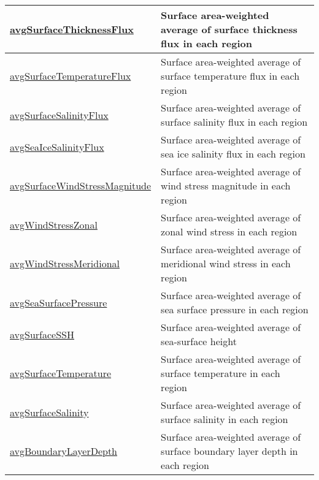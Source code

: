 {\begin{center}
\begin{longtable}{| p{2.0in} | p{4.0in} |}
    \hline
    \hyperref[subsec:var_sec_surfaceAreaWeightedAveragesAM_avgSurfaceThicknessFlux]{avgSurfaceThicknessFlux} & Surface area-weighted average of surface thickness flux in each region \\
    \hline
    \hyperref[subsec:var_sec_surfaceAreaWeightedAveragesAM_avgSurfaceTemperatureFlux]{avgSurfaceTemperatureFlux} & Surface area-weighted average of surface temperature flux in each region \\
    \hline
    \hyperref[subsec:var_sec_surfaceAreaWeightedAveragesAM_avgSurfaceSalinityFlux]{avgSurfaceSalinityFlux} & Surface area-weighted average of surface salinity flux in each region \\
    \hline
    \hyperref[subsec:var_sec_surfaceAreaWeightedAveragesAM_avgSeaIceSalinityFlux]{avgSeaIceSalinityFlux} & Surface area-weighted average of sea ice salinity flux in each region \\
    \hline
    \hyperref[subsec:var_sec_surfaceAreaWeightedAveragesAM_avgSurfaceWindStressMagnitude]{avgSurfaceWindStressMagnitude} & Surface area-weighted average of wind stress magnitude in each region \\
    \hline
    \hyperref[subsec:var_sec_surfaceAreaWeightedAveragesAM_avgWindStressZonal]{avgWindStressZonal} & Surface area-weighted average of zonal wind stress in each region \\
    \hline
    \hyperref[subsec:var_sec_surfaceAreaWeightedAveragesAM_avgWindStressMeridional]{avgWindStressMeridional} & Surface area-weighted average of meridional wind stress in each region \\
    \hline
    \hyperref[subsec:var_sec_surfaceAreaWeightedAveragesAM_avgSeaSurfacePressure]{avgSeaSurfacePressure} & Surface area-weighted average of sea surface pressure in each region \\
    \hline
    \hyperref[subsec:var_sec_surfaceAreaWeightedAveragesAM_avgSurfaceSSH]{avgSurfaceSSH} & Surface area-weighted average of sea-surface height \\
    \hline
    \hyperref[subsec:var_sec_surfaceAreaWeightedAveragesAM_avgSurfaceTemperature]{avgSurfaceTemperature} & Surface area-weighted average of surface temperature in each region \\
    \hline
    \hyperref[subsec:var_sec_surfaceAreaWeightedAveragesAM_avgSurfaceSalinity]{avgSurfaceSalinity} & Surface area-weighted average of surface salinity in each region \\
    \hline
    \hyperref[subsec:var_sec_surfaceAreaWeightedAveragesAM_avgBoundaryLayerDepth]{avgBoundaryLayerDepth} & Surface area-weighted average of surface boundary layer depth in each region \\

\end{longtable}
\end{center}}
